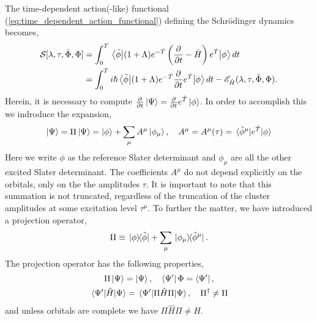 The time-dependent action(-like) functional (\autoref{eq:time_dependent_action_functional}) 
defining the Schrödinger dynamics becomes,
\begin{equation}
    \begin{aligned}
        \label{eq:oatdcc_functional}
        \mathcal{S}[\lambda, \tau, \tilde{\Phi}, \Phi]
        &= \int_0^T \mel{\tilde{\phi}}
            {(1 + \Lambda)e^{-\hat{T}}\left(\frac{\partial}{\partial t} - \hat{H} \right)e^{\hat{T}}} 
            {\phi} dt \\ 
        &= \int_0^T i\hbar\mel{\tilde{\phi}}
        {(1 + \Lambda)e^{-\hat{T}}\frac{\partial}{\partial t}e^{\hat{T}}}
        {\phi} dt
        - \mathscr{E}_{\hat{H}}(\lambda, \tau, \tilde{\Phi}, \Phi).
    \end{aligned} 
\end{equation}
Herein, it is necessary to compute 
$\frac{\partial}{\partial t}\ket{\Psi} = \frac{\partial}{\partial t}e^{\hat{T}}\ket{\phi}$.
In order to accomplish this we indroduce the expansion,
\begin{equation}
    \ket{\Psi} = \Pi\ket{\Psi} = \ket{\phi} + \sum_\mu A^\mu \ket{\phi_\mu}, \quad
    A^\mu = A^\mu(\tau) = \mel*{\tilde{\phi}^\mu}{e^{\hat{T}}}{\phi}
\end{equation}
Here we write $\phi$ as the reference Slater determinant and $\phi_\mu$ are all the other 
excited Slater determinant. The coefficients $A^\mu$ do not depend explicitly on the 
orbitals, only on the the amplitudes $\tau$. It is important to note that this summation is not truncated,
regardless of the truncation of the cluster amplitudes at some excitation level $\tau^\mu$.
To further the matter, we have introduced a projection operator,
\begin{equation}
    \Pi \equiv \outerproduct*{\phi}{\tilde{\phi}} 
    + \sum_\mu \outerproduct*{\phi_\mu}{\tilde{\phi}^\mu}.
\end{equation}
The projection operator has the following properties,
\begin{equation}
    \begin{gathered}
        \Pi \ket{\Psi} = \ket{\Psi}, \quad \bra{\Psi'}\Phi = \bra{\Psi'}, \\
        \mel{\Psi'}{\hat{H}}{\Psi} = \mel{\Psi'}{\Pi\hat{H}\Pi}{\Psi},
        \quad \Pi^\dagger \neq \Pi
    \end{gathered}
\end{equation}
and unless orbitals are complete we have $\Pi\hat{H}\Pi \neq \hat{H}$.

